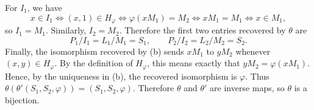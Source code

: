 \documentclass[../Odyssey_Project.tex]{subfiles}
\begin{document}
\begin{solution}
\begin{enumerate}
    For $I_1$, we have
    \[
        x \in I_1
        \Longleftrightarrow
        (x,1) \in H_{\varphi}
        \Longleftrightarrow
        \varphi(xM_1) = M_2
        \Longleftrightarrow
        xM_1 = M_1
        \Longleftrightarrow
        x \in M_1,
    \]
    so $I_1 = M_1$. Similarly, $I_2 = M_2$. Therefore the first two entries recovered by $\theta$ are
    \[
        P_1/I_1 = L_1/M_1 = S_1,
        \qquad
        P_2/I_2 = L_2/M_2 = S_2.
    \]
    Finally, the isomorphism recovered by (b) sends $xM_1$ to $yM_2$ whenever $(x,y) \in H_{\varphi}$. By the definition of $H_{\varphi}$, this means exactly that $yM_2 = \varphi(xM_1)$. Hence, by the uniqueness in (b), the recovered isomorphism is $\varphi$. Thus $\theta(\theta'(S_1,S_2,\varphi)) = (S_1,S_2,\varphi)$. Therefore $\theta$ and $\theta'$ are inverse maps, so $\theta$ is a bijection.
    \end{enumerate}
\end{solution}
\end{document}
